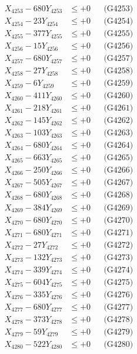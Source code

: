 \documentclass[a4paper,10pt]{article}
\begin{document}
{\begin{align}
X_{4253} - 680Y_{4253} &\leq +0 && \text{(G4253)} \\
X_{4254} - 23Y_{4254} &\leq +0 && \text{(G4254)} \\
X_{4255} - 377Y_{4255} &\leq +0 && \text{(G4255)} \\
X_{4256} - 15Y_{4256} &\leq +0 && \text{(G4256)} \\
X_{4257} - 680Y_{4257} &\leq +0 && \text{(G4257)} \\
X_{4258} - 27Y_{4258} &\leq +0 && \text{(G4258)} \\
X_{4259} - 6Y_{4259} &\leq +0 && \text{(G4259)} \\
X_{4260} - 411Y_{4260} &\leq +0 && \text{(G4260)} \\
\allowbreak
X_{4261} - 218Y_{4261} &\leq +0 && \text{(G4261)} \\
X_{4262} - 145Y_{4262} &\leq +0 && \text{(G4262)} \\
X_{4263} - 103Y_{4263} &\leq +0 && \text{(G4263)} \\
X_{4264} - 680Y_{4264} &\leq +0 && \text{(G4264)} \\
X_{4265} - 663Y_{4265} &\leq +0 && \text{(G4265)} \\
X_{4266} - 250Y_{4266} &\leq +0 && \text{(G4266)} \\
X_{4267} - 505Y_{4267} &\leq +0 && \text{(G4267)} \\
X_{4268} - 680Y_{4268} &\leq +0 && \text{(G4268)} \\
X_{4269} - 384Y_{4269} &\leq +0 && \text{(G4269)} \\
X_{4270} - 680Y_{4270} &\leq +0 && \text{(G4270)} \\
\allowbreak
X_{4271} - 680Y_{4271} &\leq +0 && \text{(G4271)} \\
X_{4272} - 27Y_{4272} &\leq +0 && \text{(G4272)} \\
X_{4273} - 132Y_{4273} &\leq +0 && \text{(G4273)} \\
X_{4274} - 339Y_{4274} &\leq +0 && \text{(G4274)} \\
X_{4275} - 604Y_{4275} &\leq +0 && \text{(G4275)} \\
X_{4276} - 335Y_{4276} &\leq +0 && \text{(G4276)} \\
X_{4277} - 680Y_{4277} &\leq +0 && \text{(G4277)} \\
X_{4278} - 373Y_{4278} &\leq +0 && \text{(G4278)} \\
X_{4279} - 59Y_{4279} &\leq +0 && \text{(G4279)} \\
X_{4280} - 522Y_{4280} &\leq +0 && \text{(G4280)} \\

\end{align}}
\end{document}

